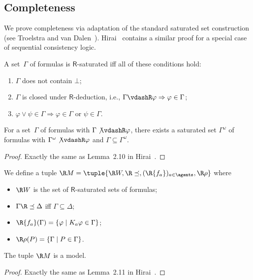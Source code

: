 \documentclass[doctor]{iscs-thesis}
\begin{document}
\subsection{Completeness}
We prove completeness via
  adaptation of the standard saturated set construction (see Troelstra
  and van Dalen~\cite[Ch.~2]{troelstra1988constructivism}).
  Hirai~\cite{lpar-hirai} contains a similar proof for a special case of
  sequential consistency logic.

\begin{definition}
 A set~$\Gamma$ of formulas is
 $\mathsf R$-saturated iff all of these conditions hold:
 \begin{enumerate}
  \item $\Gamma$ does not contain $\bot$;
  \item $\Gamma$ is closed under $\mathsf R$-deduction, i.e.,
	$\Gamma\vdashR\varphi\Rightarrow\varphi\in\Gamma$;
  \item $\varphi\vee\psi\in\Gamma\Rightarrow\varphi\in\Gamma$ or $\psi\in\Gamma$.
 \end{enumerate}
\end{definition}

\begin{lemma}
 \label{saturation}
 For a set~$\Gamma$ of formulas with $\Gamma\not\vdashR\varphi$,
 there exists a
 saturated set $\Gamma^{\omega}$ of formulas with
 $\Gamma^{\omega}\not\vdashR\varphi$ and
 $\Gamma\subseteq \Gamma^{\omega}$.
\end{lemma}
\begin{proof}
 Exactly the same as Lemma~2.10 in Hirai~\cite{lpar-hirai}.
\end{proof}


\begin{definition}
 We define a tuple
 $\R M = \tuple{\R W, \R\preceq, (\R{f_a})_{a\in \agents}, \R\rho}$
 where
 \begin{itemize}
  \item $\R W$ is the set of $\mathsf R$-saturated sets of formulas;
  \item $\Gamma\R\preceq \Delta$ iff $\Gamma\subseteq\Delta$;
  \item $\R{f_a}(\Gamma) = \{\varphi\mid K_a\varphi\in\Gamma\}$;
  \item $\R\rho(P)=\{\Gamma\mid P\in \Gamma\}$.
 \end{itemize}
\end{definition}

\begin{lemma}
 The tuple $\R M$ is a model.
\end{lemma}
\begin{proof}
 Exactly the same as Lemma~2.11 in Hirai~\cite{lpar-hirai}.
\end{proof}
\end{document}
